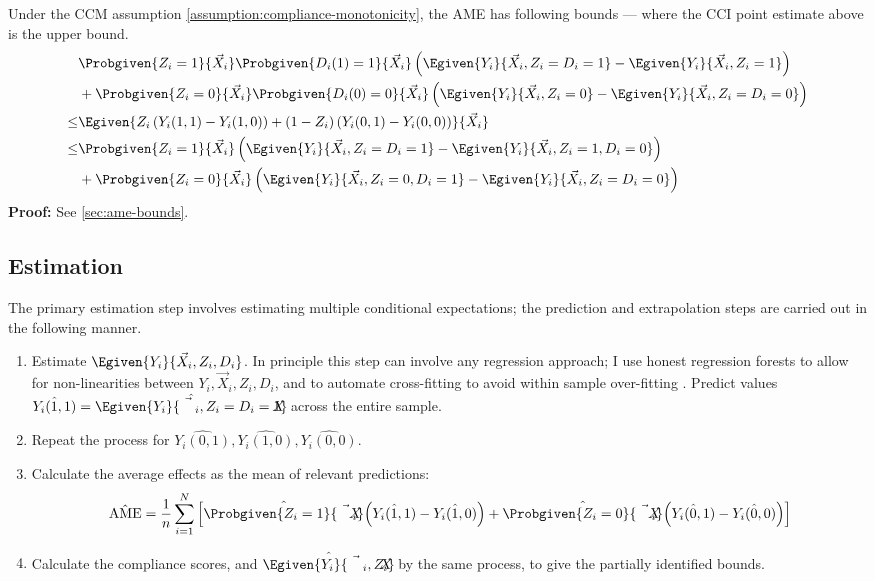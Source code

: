 Under the CCM assumption \ref{assumption:compliance-monotonicity}, the AME has following bounds --- where the CCI point estimate above is the upper bound.
\begin{align*}
    & \Probgiven{Z_i = 1}{\vec X_i} \Probgiven{D_i(1) = 1}{\vec X_i} \left(
        \Egiven{ Y_i }{ \vec X_i, Z_i = D_i = 1}
            - \Egiven{ Y_i }{ \vec X_i, Z_i = 1} \right) \\
    &+ \Probgiven{Z_i = 0}{\vec X_i} \Probgiven{D_i(0) = 0}{\vec X_i} \left(
        \Egiven{ Y_i }{ \vec X_i, Z_i = 0}
            - \Egiven{ Y_i }{ \vec X_i, Z_i = D_i = 0} \right) \\
    \leq & \Egiven{ Z_i \left(Y_i(1, 1) - Y_i(1, 0) \right)
    + (1 - Z_i) \left(Y_i(0, 1) - Y_i(0, 0) \right)}{\vec X_i} \\
    \leq& \Probgiven{Z_i = 1}{\vec X_i} \left(
        \Egiven{ Y_i }{ \vec X_i, Z_i = D_i = 1}
            - \Egiven{ Y_i }{ \vec X_i, Z_i = 1, D_i = 0} \right) \\
    &+ \Probgiven{Z_i = 0}{\vec X_i} \left(
        \Egiven{ Y_i }{ \vec X_i, Z_i = 0, D_i = 1}
            - \Egiven{ Y_i }{ \vec X_i, Z_i = D_i = 0} \right)
\end{align*}
\textbf{Proof:} See \autoref{sec:ame-bounds}.


\subsection{Estimation}
\label{sec:estimation}

The primary estimation step involves estimating multiple conditional expectations;
the prediction and extrapolation steps are carried out in the following manner.

\begin{enumerate}
    \item Estimate $\Egiven{ Y_i }{ \vec X_i, Z_i, D_i}$.
    In principle this step can involve any regression approach; I use honest regression forests to allow for non-linearities between $Y_i, \vec X_i, Z_i, D_i$, and to automate cross-fitting to avoid within sample over-fitting \citep{athey2019generalized}.
    Predict values $\hat{Y_i(1,1)} = \hat{\Egiven{ Y_i }{ \vec X_i, Z_i = D_i = 1}}$ across the entire sample.
    \item Repeat the process for $\hat{Y_i(0,1)}, \hat{Y_i(1,0)}, \hat{Y_i(0,0)}$. %
    \item Calculate the average effects as the mean of relevant predictions:
    \[ \hat{\text{AME}}
    = \frac 1n \sum_{i=1}^N \left[ 
        \hat{\Probgiven{Z_i = 1}{\vec X_i}} \left( \hat{ Y_i(1,1)} - \hat{Y_i(1, 0)} \right)
        + \hat{\Probgiven{Z_i = 0}{\vec X_i}} \left( \hat{ Y_i(0,1)} - \hat{Y_i(0, 0)} \right) \right]
    \]
    \item Calculate the compliance scores, and $\hat{\Egiven{Y_i}{\vec X_i, Z_i}}$ by the same process, to give the partially identified bounds.
\end{enumerate}

